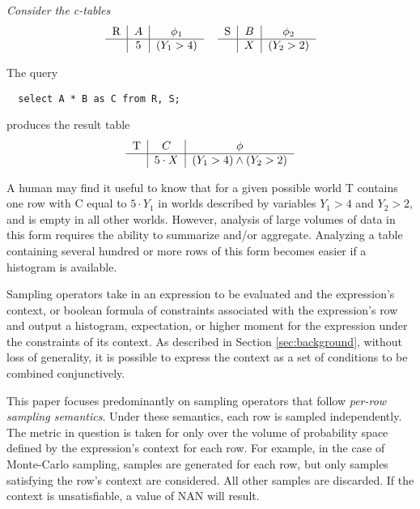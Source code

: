 \begin{example}\em
Consider the c-tables 
\[
\begin{tabular}{lr}
\begin{tabular}{c|c|c}
R & $A$ & $\phi_1$\\
\hline
& $5$ & $(Y_1 > 4)$ 
\end{tabular} & \begin{tabular}{c|c|c}
 S & $B$ & $\phi_2$ \\
\hline
& $X$ & $(Y_2 > 2)$
\end{tabular}
\end{tabular}
\]

The query {\small\begin{verbatim}
  select A * B as C from R, S;
\end{verbatim}} produces the result table
\[
\begin{tabular}{c|c|c}
T & $C$ & $\phi$\\
\hline
& $5\cdot X$ & $(Y_1 > 4) \wedge (Y_2 > 2)$ 
\end{tabular}
\]

A human may find it useful to know that for a given possible world T contains one row with C equal to $5 \cdot Y_1$ in worlds described by variables $Y_1 > 4$ and $Y_2 > 2$, and is empty in all other worlds.  However, analysis of large volumes of data in this form requires the ability to summarize and/or aggregate.  Analyzing a table containing several hundred or more rows of this form becomes easier if a histogram is available.
\end{example}

Sampling operators take in an expression to be evaluated and the expression's context, or boolean formula of constraints associated with the expression's row and output a histogram, expectation, or higher moment for the expression under the constraints of its context.  As described in Section \ref{sec:background}, without loss of generality, it is possible to express the context as a set of conditions to be combined conjunctively.  

This paper focuses predominantly on sampling operators that follow \textit{per-row sampling semantics}.  Under these semantics, each row is sampled independently.  The metric in question is taken for only over the volume of probability space defined by the expression's context for each row.  For example, in the case of Monte-Carlo sampling, samples are generated for each row, but only samples satisfying the row's context are considered.  All other samples are discarded.  If the context is unsatisfiable, a value of NAN will result.

